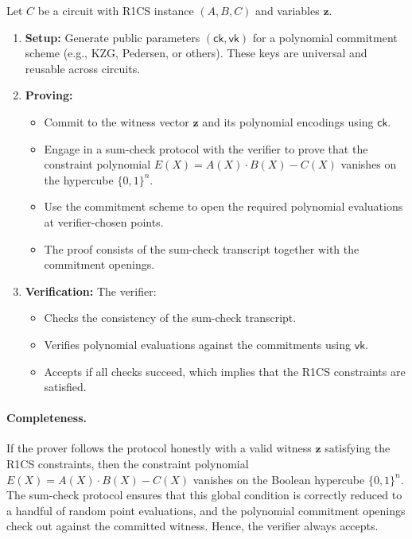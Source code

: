 \begin{protocol}
Let $C$ be a circuit with R1CS instance $(A,B,C)$ and variables $\mathbf{z}$.

\begin{enumerate}
  \item \textbf{Setup:}  
  Generate public parameters $(\mathsf{ck},\mathsf{vk})$ for a polynomial commitment scheme 
  (e.g., KZG, Pedersen, or others).  
  These keys are universal and reusable across circuits.

  \item \textbf{Proving:}  
  \begin{itemize}
    \item Commit to the witness vector $\mathbf{z}$ and its polynomial encodings using $\mathsf{ck}$.
    \item Engage in a sum-check protocol with the verifier to prove that the constraint polynomial 
          $E(X) = A(X)\cdot B(X) - C(X)$ vanishes on the hypercube $\{0,1\}^n$.
    \item Use the commitment scheme to open the required polynomial evaluations at verifier-chosen points.
    \item The proof consists of the sum-check transcript together with the commitment openings.
  \end{itemize}

  \item \textbf{Verification:}  
  The verifier:
  \begin{itemize}
    \item Checks the consistency of the sum-check transcript.
    \item Verifies polynomial evaluations against the commitments using $\mathsf{vk}$.
    \item Accepts if all checks succeed, which implies that the R1CS constraints are satisfied.
  \end{itemize}
\end{enumerate}
\end{protocol}

\myspace

\paragraph{Completeness.}
If the prover follows the protocol honestly with a valid witness $\mathbf{z}$ satisfying the R1CS constraints, 
then the constraint polynomial $E(X) = A(X)\cdot B(X) - C(X)$ vanishes on the Boolean hypercube $\{0,1\}^n$. 
The sum-check protocol ensures that this global condition is correctly reduced to a handful of random point evaluations, 
and the polynomial commitment openings check out against the committed witness. 
Hence, the verifier always accepts.

